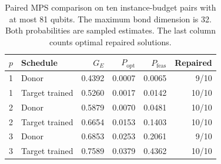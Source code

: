\begin{table}[tb]
\centering
\small
\caption{Paired MPS comparison on ten instance-budget pairs with at most 81 qubits. The maximum bond dimension is 32. Both probabilities are sampled estimates. The last column counts optimal repaired solutions.}
\label{tab:mid}
\begin{tabular}{llrrrr}
\toprule
$p$ & Schedule & $G_E$ & $P_{\mathrm{opt}}$ & $P_{\mathrm{feas}}$ & Repaired \\
\midrule
1 & Donor & 0.4392 & 0.0007 & 0.0065 & 9/10 \\
1 & Target trained & 0.5260 & 0.0017 & 0.0142 & 10/10 \\
2 & Donor & 0.5879 & 0.0070 & 0.0481 & 10/10 \\
2 & Target trained & 0.6654 & 0.0153 & 0.1403 & 10/10 \\
3 & Donor & 0.6853 & 0.0253 & 0.2061 & 9/10 \\
3 & Target trained & 0.7589 & 0.0379 & 0.4362 & 10/10 \\
\bottomrule
\end{tabular}
\end{table}
